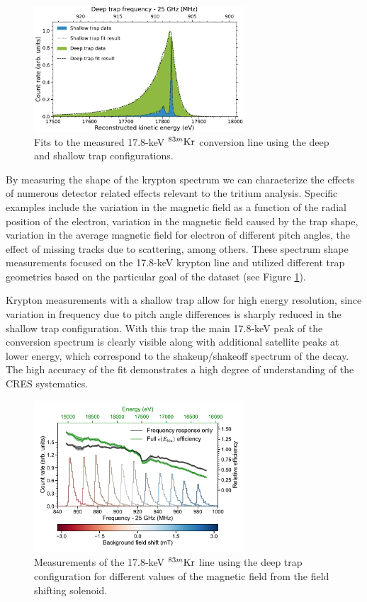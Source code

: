 \begin{figure}[htbp]
    \centering
    \includegraphics[width=0.7\textwidth]{figs/Chapter-3/kr_fit.pdf}
    \caption{Fits to the measured 17.8-keV $^{83m}\rm{Kr}$ conversion line using the deep and shallow trap configurations. }
    \label{fig:chap3-krypton-spec-fit}
\end{figure}

By measuring the shape of the krypton spectrum we can characterize the effects of numerous detector related effects relevant to the tritium analysis. Specific examples include the variation in the magnetic field as a function of the radial position of the electron, variation in the magnetic field caused by the trap shape, variation in the average magnetic field for electron of different pitch angles, the effect of missing tracks due to scattering, among others. These spectrum shape measurements focused on the 17.8-keV krypton line and utilized different trap geometries based on the particular goal of the dataset (see Figure \ref{fig:chap3-krypton-spec-fit}).

Krypton measurements with a shallow trap allow for high energy resolution, since variation in frequency due to pitch angle differences is sharply reduced in the shallow trap configuration. With this trap the main 17.8-keV peak of the conversion spectrum is clearly visible along with additional satellite peaks at lower energy, which correspond to the shakeup/shakeoff spectrum of the decay. The high accuracy of the fit demonstrates a high degree of understanding of the CRES systematics.

\begin{figure}[htbp]
    \centering
    \includegraphics[width=0.7\textwidth]{figs/Chapter-3/fss_for_prl_plot.pdf}
    \caption{Measurements of the 17.8-keV $^{83m}\rm{Kr}$ line using the deep trap configuration for different values of the magnetic field from the field shifting solenoid.}
    \label{fig:chap3-fss-plot}
\end{figure}

